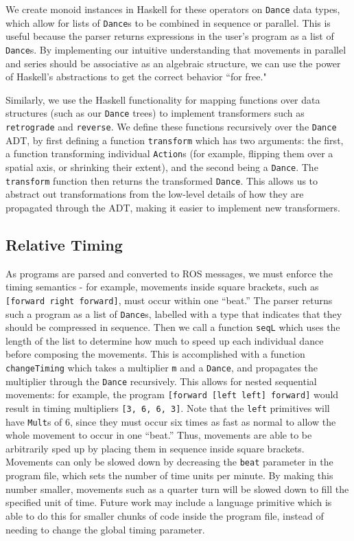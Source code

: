 \documentclass[sigchi-a]{acmart}
\begin{document}
We create monoid instances in Haskell for these operators on
\texttt{Dance} data types, which allow for lists of \texttt{Dance}s to be combined
in sequence or parallel. This is useful because the parser returns expressions
in the user's program as a list of \texttt{Dance}s. By implementing our intuitive understanding that movements in parallel and
series should be associative as an algebraic structure, we can use the power of Haskell's abstractions to
get the correct behavior ``for free."

Similarly, we use the Haskell functionality for mapping functions over data structures
(such as our \texttt{Dance} trees) to implement transformers such as
\texttt{retrograde} and \texttt{reverse}. We define these functions recursively
over the \texttt{Dance} ADT, by first defining a function \texttt{transform}
which has two arguments: the first, a function transforming individual
\texttt{Action}s (for example, flipping them over a spatial axis, or shrinking
their extent), and the
second being a \texttt{Dance}. The \texttt{transform} function then returns the
transformed \texttt{Dance}. This allows us to abstract out transformations from the
low-level details of how they are propagated through the ADT, making it easier
to implement new transformers.

\subsection{Relative Timing}\label{relative-timing}

As programs are parsed and converted to ROS messages, we must enforce the timing semantics - for example, movements
inside square brackets, such as \texttt{{[}forward\ right\ forward{]}},
must occur within one ``beat.'' The parser returns such a program as a list of \texttt{Dance}s, labelled with a type
that indicates that they should be compressed in sequence.
Then we call a function \texttt{seqL} which uses the length of the
 list to determine how much to speed up each individual dance
before composing the movements. This is accomplished with a function
\texttt{changeTiming} which takes a multiplier \texttt{m} and a
\texttt{Dance}, and propagates the multiplier through the \texttt{Dance}
recursively. This allows for nested sequential movements: for example,
the program \texttt{{[}forward\ {[}left\ left{]}\ forward{]}} would
result in timing multipliers \texttt{[3, 6, 6, 3]}. Note that the \texttt{left}
primitives will have \texttt{Mult}s of 6, since
they must occur six times as fast as normal to allow the whole movement
to occur in one ``beat.'' Thus, movements are able to be arbitrarily sped up by
placing them in sequence inside square brackets. Movements can only be slowed
down by decreasing the \texttt{beat} parameter in the program file, which sets
the number of time units per minute. By making this number smaller, movements
such as a quarter turn will be slowed down to fill the specified unit of time.
Future work may include a language primitive which is able to do this for
smaller chunks of code inside the program file, instead of needing to change the
global timing parameter.
\end{document}
